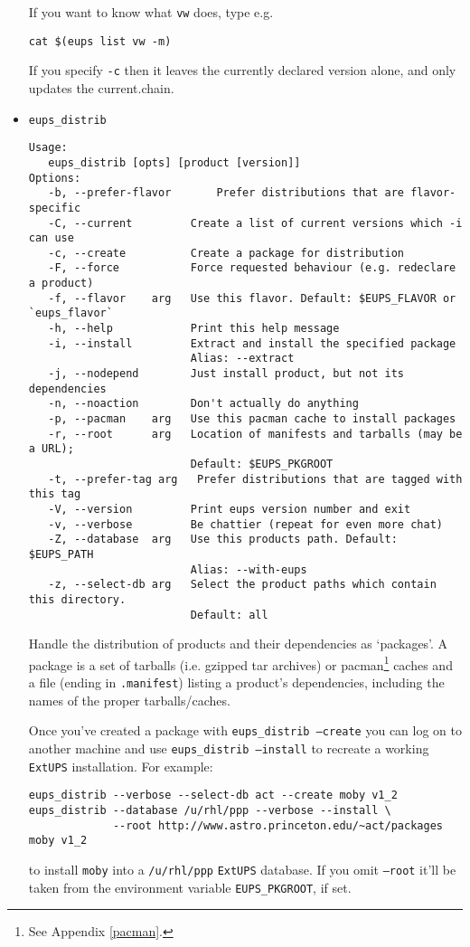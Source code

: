 \documentclass{article}
\newcommand{\code}[1]{\texttt{#1}}
\newcommand{\file}[1]{\texttt{#1}}
\newcommand{\eups}{\code{ExtUPS}}
\begin{document}
\begin{itemize}
If you want to
know what \code{vw} does, type e.g.
\begin{verbatim}
cat $(eups list vw -m)
\end{verbatim}

If you specify \code{-c} then it leaves the currently declared version alone, and
only updates the current.chain.


  \item \code{eups\_distrib}
\begin{verbatim}
Usage:
   eups_distrib [opts] [product [version]]
Options:
   -b, --prefer-flavor       Prefer distributions that are flavor-specific
   -C, --current         Create a list of current versions which -i can use
   -c, --create          Create a package for distribution
   -F, --force           Force requested behaviour (e.g. redeclare a product)
   -f, --flavor    arg   Use this flavor. Default: $EUPS_FLAVOR or `eups_flavor`
   -h, --help            Print this help message
   -i, --install         Extract and install the specified package
                         Alias: --extract
   -j, --nodepend        Just install product, but not its dependencies
   -n, --noaction        Don't actually do anything
   -p, --pacman    arg   Use this pacman cache to install packages
   -r, --root      arg   Location of manifests and tarballs (may be a URL);
                         Default: $EUPS_PKGROOT
   -t, --prefer-tag arg   Prefer distributions that are tagged with this tag
   -V, --version         Print eups version number and exit
   -v, --verbose         Be chattier (repeat for even more chat)
   -Z, --database  arg   Use this products path. Default: $EUPS_PATH
                         Alias: --with-eups
   -z, --select-db arg   Select the product paths which contain this directory.
                         Default: all
\end{verbatim} %

Handle the distribution of products and their dependencies as `packages'. A
package is a set of tarballs (i.e. gzipped tar archives) or pacman\footnote{%
  See Appendix \ref{pacman}.
}
caches and
a file (ending in \code{.manifest})
listing a product's dependencies, including the names of the proper tarballs/caches. 

Once you've created a package with \code{eups\_distrib --create} you can log on to
another machine and use \code{eups\_distrib --install} to
recreate a working \eups{} installation.  For example:
\begin{verbatim}
eups_distrib --verbose --select-db act --create moby v1_2
eups_distrib --database /u/rhl/ppp --verbose --install \
             --root http://www.astro.princeton.edu/~act/packages moby v1_2
\end{verbatim}
to install \code{moby} into a \file{/u/rhl/ppp} \eups{} database. If you omit
\code{--root} it'll be taken from the environment variable \code{EUPS\_PKGROOT},
if set.


\end{itemize}
\end{document}
